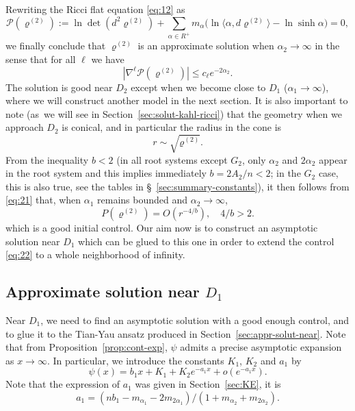 \documentclass[10pt]{amsart}
\theoremstyle{plain}
\theoremstyle{definition}
\newcommand{\rRoots}{R}
\newcommand{\opP}{\mathcal{P}}
\newcommand{\rhodeux}{\varrho^{(2)}}
\begin{document}
Rewriting the Ricci flat equation \eqref{eq:12} as
\begin{equation}
\label{eq:8}
\opP(\rhodeux) := \ln\det(d^2\rhodeux) + \sum_{\alpha\in \rRoots^+}m_\alpha \big( \ln \langle\alpha,d\rhodeux\rangle - \ln \sinh \alpha \big) = 0,
\end{equation}
we finally conclude that $\rhodeux$ is an approximate solution when $\alpha_2\to\infty$ in the sense that for all $\ell$ we have
\begin{equation}
\label{eq:21}
|\nabla^\ell \opP(\rhodeux)| \leq c_\ell e^{-2\alpha_2}.
\end{equation}
The solution is good near $D_2$ except when we become close to $D_1$ ($\alpha_1\to\infty$), where we will construct another model in the next section. It is also important to note (as~we will see in Section~\ref{sec:solut-kahl-ricci}) that the geometry when we approach $D_2$ is conical,
and in particular the radius in the cone is \[ r\sim\sqrt{\rhodeux}. \] From the inequality $b<2$ (in all root systems except $G_2$, only $\alpha_2$ and $2\alpha_2$ appear in the root system and this implies immediately $b=2A_2/n<2$; in the $G_2$ case, this is also true, see the tables in §~\ref{sec:summary-constants}), it then follows from \eqref{eq:21} that, when $\alpha_1$ remains bounded and $\alpha_2\to\infty$,
\begin{equation}
\label{eq:22}
P(\rhodeux) = O(r^{-4/b}), \quad4/b > 2.
\end{equation}
which is a good initial control. Our aim now is to construct an asymptotic solution near $D_1$ which can be glued to this one in order to extend the control \eqref{eq:22} to a whole neighborhood of infinity.

\subsection{Approximate solution near $D_1$}

Near $D_1$, we need to find an asymptotic solution with a good enough
control, and to glue it to the Tian-Yau ansatz produced in
Section~\ref{sec:appr-solut-near}. Note that from
Proposition~\ref{prop:cont-exp}, $\psi$ admits a precise asymptotic
expansion as $x\to \infty$. In particular, we introduce the constants
$K_1$, $K_2$ and $a_1$ by
\begin{equation}
\psi(x)=b_1x+K_1+K_2e^{-a_1x}+o(e^{-a_1x}).
\end{equation}
Note that the expression of
$a_1$ was given in Section~\ref{sec:KE}, it is
$$a_1=(nb_1-m_{\alpha_1}-2m_{2\alpha_1})/(1+m_{\alpha_2}+m_{2\alpha_2}).$$
\end{document}
